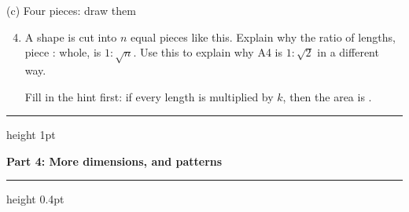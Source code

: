 \documentclass[11pt,a4paper]{article}
\newcommand{\ansline}[1][2.2cm]{\underline{\hspace{#1}}}
\newcommand{\parttitle}[2]{%
  \par\vspace{4pt}%
  {\color{blue!45!black}\hrule height 1pt}\vspace{3pt}%
  {\large\bfseries Part #1: #2\par}\vspace{2pt}%
  {\color{blue!45!black}\hrule height 0.4pt}\vspace{3pt}}
\begin{document}
\begin{enumerate}[resume]
\begin{minipage}[b]{0.31\linewidth}
\small (c) Four pieces: draw them
\end{minipage}

\begin{enumerate}
  \setcounter{enumii}{3}
  \item A shape is cut into $n$ equal pieces like this. Explain why the ratio
        of lengths, piece : whole, is $1:\sqrt{n}$. Use this to explain why A4
        is $1:\sqrt{2}$ in a different way.

        Fill in the hint first: if every length is multiplied by $k$, then the
        area is \ansline[3.5cm].
\end{enumerate}

\end{enumerate}

\newpage


\parttitle{4}{More dimensions, and patterns}
\end{document}
